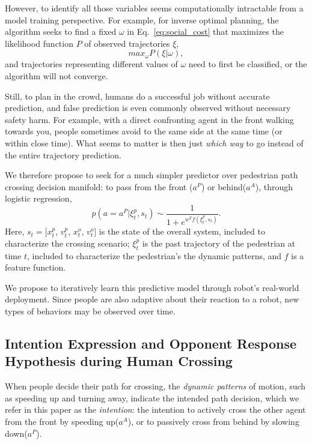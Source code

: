 \documentclass[conference]{IEEEtran}
\begin{document}
However, to identify all those variables seems computationally intractable 
from a model training perspective. For example, for inverse optimal planning, 
the algorithm seeks to find a fixed $\omega$ in 
Eq.~\ref{eq:social_cost} that maximizes the likelihood function $P$ of 
observed trajectories $\xi$,
\begin{equation}
  max_{\omega} P(\xi|\omega),
\end{equation}
and trajectories representing different values of $\omega$ need to first be 
classified, or the algorithm will not converge. 

Still, to plan in the crowd, humans do a successful job without accurate 
prediction, and false prediction is even commonly observed without necessary 
safety harm. For example, with a direct confronting agent in the front walking 
towards you, people sometimes avoid to the same side at the same time (or 
within close time). What seems to matter is then just \textit{which way} 
to go instead of the entire trajectory prediction. 

We therefore propose to seek for a much simpler predictor over pedestrian path 
crossing decision manifold: to pass from the front ($a^P$) or behind($a^A$), 
through logistic regression,
\begin{equation}
p(a=a^P|\xi^p_t, s_t) \sim \frac{1}{1+e^{w^Tf(\xi^p_t, s_t)}}.
\end{equation}
Here, $s_t = [x^p_t$, $v^p_t$, $x^o_t$, $v^o_t]$ is the state of the overall 
system, included to characterize the crossing scenario;  $\xi^p_t$ is the past 
trajectory of the pedestrian at time $t$, included to characterize the 
pedestrian's the dynamic patterns, and $f$ is a feature function.


We propose to iteratively learn this predictive model through robot's real-world 
deployment. Since people are also adaptive about their reaction to a robot, 
new types of behaviors may be observed over time.

\vspace{-.3em}
\subsection{Intention Expression and Opponent Response Hypothesis during Human Crossing}
When people decide their path for crossing, the \textit{dynamic patterns} of 
motion, such as speeding up and turning away, indicate the intended path 
decision, which we refer in this paper as the \textit{intention}: the 
intention to actively cross the other agent from the front by speeding up($a^A$), 
or to passively cross from behind by slowing down($a^P$).
\end{document}
